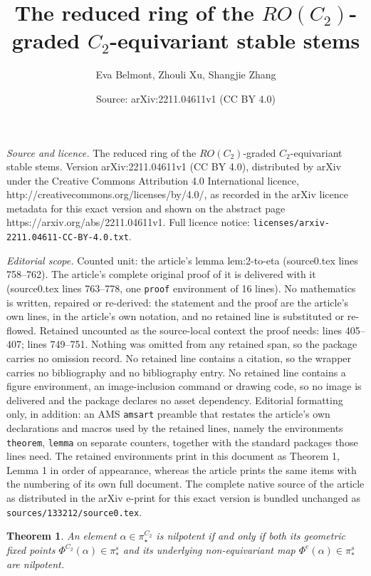 \documentclass[10pt,a4paper]{amsart}
\title{The reduced ring of the $RO(C_2)$-graded $C_2$-equivariant stable stems}
\author{Eva Belmont, Zhouli Xu, Shangjie Zhang}
\date{Source: arXiv:2211.04611v1 (CC BY 4.0)}
\newtheorem{theorem}{Theorem}
\begin{document}
\maketitle

\noindent\emph{Source and licence.} The reduced ring of the $RO(C_2)$-graded $C_2$-equivariant stable stems. Version arXiv:2211.04611v1 (CC BY 4.0), distributed by arXiv under the Creative Commons Attribution 4.0 International licence, http://creativecommons.org/licenses/by/4.0/, as recorded in the arXiv licence metadata for this exact version and shown on the abstract page https://arxiv.org/abs/2211.04611v1. Full licence notice: \texttt{licenses/arxiv-2211.04611-CC-BY-4.0.txt}.\par\smallskip

\noindent\textit{Editorial scope.} Counted unit: the article's lemma lem:2-to-eta (source0.tex lines 758--762). The article's complete original proof of it is delivered with it (source0.tex lines 763--778, one \texttt{proof} environment of 16 lines). No mathematics is written, repaired or re-derived: the statement and the proof are the article's own lines, in the article's own notation, and no retained line is substituted or re-flowed.  Retained uncounted as the source-local context the proof needs: lines 405--407; lines 749--751.  Nothing was omitted from any retained span, so the package carries no omission record.  No retained line contains a citation, so the wrapper carries no bibliography and no bibliography entry.  No retained line contains a figure environment, an image-inclusion command or drawing code, so no image is delivered and the package declares no asset dependency.  Editorial formatting only, in addition: an AMS \texttt{amsart} preamble that restates the article's own declarations and macros used by the retained lines, namely the environments \texttt{theorem}, \texttt{lemma} on separate counters, together with the standard packages those lines need.  The retained environments print in this document as Theorem 1, Lemma 1 in order of appearance, whereas the article prints the same items with the numbering of its own full document.  The complete native source of the article as distributed in the arXiv e-print for this exact version is bundled unchanged as \texttt{sources/133212/source0.tex}.
\begin{theorem}\label{thm: BS, BGH}
An element $\alpha\in \pi_\star^{C_2}$ is nilpotent if and only if both its geometric fixed points $\Phi^{C_2}(\alpha)\in \pi_*^s$ and its underlying non-equivariant map $\Phi^e(\alpha)\in \pi_*^s$ are nilpotent.
\end{theorem}
\end{document}
